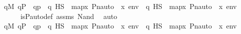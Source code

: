 \begin{isabellebody}
\ {\isachardoublequoteopen}{\isachardot}{\kern0pt}{\isachardot}{\kern0pt}{\isachardot}{\kern0pt}\ {\isasymlongleftrightarrow}\ {\isasymnot}{\isacharparenleft}{\kern0pt}{\isasymexists}q{\isasymin}M{\isachardot}{\kern0pt}\ q{\isasymin}P\ {\isasymand}\ {\isasympi}{\isacharbackquote}{\kern0pt}q{\isasympreceq}{\isasympi}{\isacharbackquote}{\kern0pt}p\ {\isasymand}\ {\isacharparenleft}{\kern0pt}{\isasympi}{\isacharbackquote}{\kern0pt}q\ {\isasymtturnstile}HS\ {\isasymphi}\ map{\isacharparenleft}{\kern0pt}{\isasymlambda}x{\isachardot}{\kern0pt}\ Pn{\isacharunderscore}{\kern0pt}auto{\isacharparenleft}{\kern0pt}{\isasympi}{\isacharparenright}{\kern0pt}\ {\isacharbackquote}{\kern0pt}\ x{\isacharcomma}{\kern0pt}\ env{\isacharparenright}{\kern0pt}{\isacharparenright}{\kern0pt}\ {\isasymand}\ {\isacharparenleft}{\kern0pt}{\isasympi}{\isacharbackquote}{\kern0pt}q\ {\isasymtturnstile}HS\ {\isasympsi}\ map{\isacharparenleft}{\kern0pt}{\isasymlambda}x{\isachardot}{\kern0pt}\ Pn{\isacharunderscore}{\kern0pt}auto{\isacharparenleft}{\kern0pt}{\isasympi}{\isacharparenright}{\kern0pt}\ {\isacharbackquote}{\kern0pt}\ x{\isacharcomma}{\kern0pt}\ env{\isacharparenright}{\kern0pt}{\isacharparenright}{\kern0pt}{\isacharparenright}{\kern0pt}{\isachardoublequoteclose}\isanewline
\ \ \ \ \ \ \isamarkupfalse%
\ is{\isacharunderscore}{\kern0pt}P{\isacharunderscore}{\kern0pt}auto{\isacharunderscore}{\kern0pt}def\ assms\ Nand\ \isamarkupfalse%
\ auto\isanewline
\ \ \ \ \isamarkupfalse%
\ \isamarkupfalse%
\ {\isachardoublequoteopen}{\isachardot}{\kern0pt}{\isachardot}{\kern0pt}{\isachardot}{\kern0pt}\ {\isasymlongleftrightarrow}\ {\isasymnot}{\isacharparenleft}{\kern0pt}{\isasymexists}q{\isasymin}M{\isachardot}{\kern0pt}\ q{\isasymin}P\ {\isasymand}\ q{\isasympreceq}{\isasympi}{\isacharbackquote}{\kern0pt}p\ {\isasymand}\ {\isacharparenleft}{\kern0pt}q\ {\isasymtturnstile}HS\ {\isasymphi}\ map{\isacharparenleft}{\kern0pt}{\isasymlambda}x{\isachardot}{\kern0pt}\ Pn{\isacharunderscore}{\kern0pt}auto{\isacharparenleft}{\kern0pt}{\isasympi}{\isacharparenright}{\kern0pt}\ {\isacharbackquote}{\kern0pt}\ x{\isacharcomma}{\kern0pt}\ env{\isacharparenright}{\kern0pt}{\isacharparenright}{\kern0pt}\ {\isasymand}\ {\isacharparenleft}{\kern0pt}q\ {\isasymtturnstile}HS\ {\isasympsi}\ map{\isacharparenleft}{\kern0pt}{\isasymlambda}x{\isachardot}{\kern0pt}\ Pn{\isacharunderscore}{\kern0pt}auto{\isacharparenleft}{\kern0pt}{\isasympi}{\isacharparenright}{\kern0pt}\ {\isacharbackquote}{\kern0pt}\ x{\isacharcomma}{\kern0pt}\ env{\isacharparenright}{\kern0pt}{\isacharparenright}{\kern0pt}{\isacharparenright}{\kern0pt}{\isachardoublequoteclose}\isanewline

\end{isabellebody}
